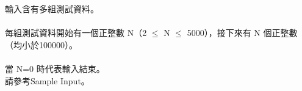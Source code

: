 輸入含有多組測試資料。\\
\\
每組測試資料開始有一個正整數 N（2 $\leq$ N $\leq$ 5000），接下來有 N 個正整數（均小於100000）。\\
\\
當 N=0 時代表輸入結束。\\
請參考Sample Input。\\